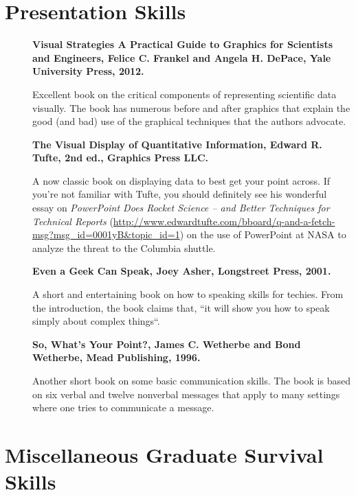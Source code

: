\documentclass[11pt]{article}
\begin{document}
\section{Presentation Skills}

\begin{description}
\item[ ]  {\bf Visual Strategies A Practical Guide to Graphics for Scientists and Engineers, Felice C. Frankel and Angela H. DePace, Yale University Press, 2012.}  

Excellent book on the critical components of representing scientific data visually.   The book has numerous before and after graphics that explain the good (and bad) use of the graphical techniques that the authors advocate.

\item[] {\bf The Visual Display of Quantitative Information, Edward R. Tufte, 2nd ed., Graphics Press LLC.} 

A now classic book on displaying data to best get your point across. If you're not familiar with Tufte, you should definitely see his wonderful essay on {\it PowerPoint Does Rocket Science -- and Better Techniques for Technical Reports} (\url{http://www.edwardtufte.com/bboard/q-and-a-fetch-msg?msg_id=0001yB&topic_id=1}) on the use of PowerPoint at NASA to analyze the threat to the Columbia shuttle.

\item[] {\bf Even a Geek Can Speak, Joey Asher, Longstreet Press, 2001.}  

A short and entertaining book on how to speaking skills for techies.   From the introduction, the book claims that, ``it will show you how to speak simply about complex things``.
 
\item[] {\bf So, What's Your Point?,  James C. Wetherbe and Bond Wetherbe, Mead Publishing, 1996.}  

Another short book on some basic communication skills.  The book is based on six verbal and twelve nonverbal messages that apply to many settings where one tries to communicate a message.
 
\end{description}

\section{Miscellaneous Graduate Survival Skills}
\end{document}
